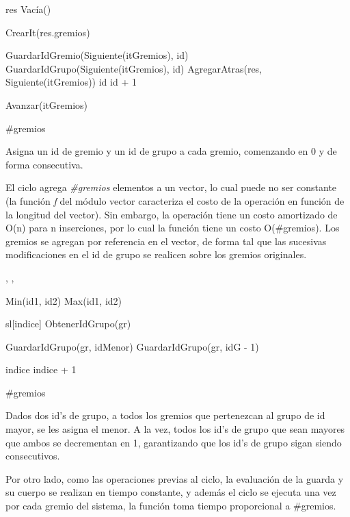 {
	\state {} 											
	\state res \asig 	Vac\'ia()											
	\state 

	\state {} \asig CrearIt(res.gremios)		
		\state
		
		\state GuardarIdGremio(Siguiente(itGremios), id)					
		\state GuardarIdGrupo(Siguiente(itGremios), id)						
		\state AgregarAtras(res, Siguiente(itGremios))						
		\state id \asig id + 1												
		
		\state
		\state Avanzar(itGremios)											
	\endwhile
}
{ \#gremios }
{ Asigna un id de gremio y un id de grupo a cada gremio, comenzando en 0 y de forma consecutiva.

\hspace{10pt} El ciclo agrega \emph{\#gremios} elementos a un vector, lo cual puede no ser constante (la funci\'on \emph{f} del m\'odulo vector caracteriza el costo de la operación en función de la longitud del vector). Sin embargo, la operaci\'on tiene un costo amortizado de O(n) para n inserciones, por lo cual la funci\'on tiene un costo O(\#gremios). Los gremios se agregan por referencia en el vector, de forma tal que las sucesivas modificaciones en el id de grupo se realicen sobre los gremios originales. }

{, , }{}
{
	\state {} \asig Min(id1, id2)						
	\state {} \asig Max(id1, id2)						
	\state

	\state {} 										

									
		\state

		\state {} \asig sl[indice]					
		\state {} \asig ObtenerIdGrupo(gr)					
		\state

														
			\state GuardarIdGrupo(gr, idMenor)								
		\Else {}										
				\state GuardarIdGrupo(gr, idG - 1)							
			\endif
		\endif
		\state

		\state indice \asig indice + 1										
	\endwhile
}
{\#gremios}
{ Dados dos id's de grupo, a todos los gremios que pertenezcan al grupo de id mayor, se les asigna el menor. A la vez, todos los id's de grupo que sean mayores que ambos se decrementan en 1, garantizando que los id's de grupo sigan siendo consecutivos.

\hspace{10pt} Por otro lado, como las operaciones previas al ciclo, la evaluaci\'on de la guarda y su cuerpo se realizan en tiempo constante, y adem\'as el ciclo se ejecuta una vez por cada gremio del sistema, la funci\'on toma tiempo proporcional a \#gremios. }

